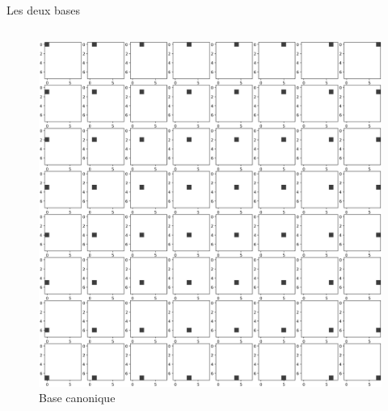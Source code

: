\documentclass[xcolor=dvipsnames]{beamer}
\begin{document}
\begin{frame}{Les deux bases}

    \begin{columns}
        \begin{column}{0.4\textwidth}
            \begin{figure}
                \centering
                \includegraphics[width=1\linewidth]{base_canonique.png}
                \caption{Base canonique}
            \end{figure}
        \end{column}
  

\end{columns}
\end{frame}
\end{document}
